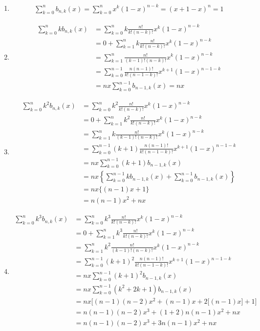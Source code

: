 \begin{enumerate}
	\item 
	\begin{align*}
		\sum_{k=0}^{n} b_{n,k}(x) = \sum_{k=0}^{n} x^k (1-x)^{n-k} = (x+1-x)^n = 1
	\end{align*}
	\item 
	\begin{align*}
		\sum_{k=0}^{n} k b_{n,k}(x) &= \sum_{k=0}^{n} k \frac{n!}{k!(n-k)!} x^k (1-x)^{n-k}\\
		&= 0 + \sum_{k=1}^{n} k \frac{n!}{k!(n-k)!} x^k (1-x)^{n-k}\\
		&= \sum_{k=1}^{n} \frac{n!}{(k-1)!(n-k)!} x^k (1-x)^{n-k}\\
		&= \sum_{k=0}^{n-1} \frac{n (n-1)!}{k! (n-1-k)!} x^{k+1} (1-x)^{n-1-k} \\
		&= nx \sum_{k=0}^{n-1} b_{n-1,k}(x) = nx
	\end{align*}
	\item 
	\begin{align*}
		\sum_{k=0}^{n} k^2 b_{n,k}(x) &= \sum_{k=0}^{n} k^2 \frac{n!}{k!(n-k)!} x^k(1-x)^{n-k}\\
		&= 0 + \sum_{k=1}^{n}  k^2 \frac{n!}{k!(n-k)!} x^k(1-x)^{n-k}\\
		&= \sum_{k=1}^{n} k \frac{n!}{(k-1)!(n-k)!} x^k (1-x)^{n-k}\\
		&= \sum_{k=0}^{n-1} (k+1) \frac{n(n-1)!}{k!(n-1-k)!} x^{k+1} (1-x)^{n-1-k}\\
		&= nx \sum_{k=0}^{n-1} (k+1) b_{n-1,k}(x)\\
		&= nx \left\{\sum_{k=0}^{n-1}kb_{n-1,k}(x) + \sum_{k=0}^{n-1} b_{n-1,k}(x)\right\}\\
		&= nx \Big\{(n-1)x+1\Big\}\\
	&= n(n-1)x^2 + nx
	\end{align*}
		\item 
	\begin{align*}
		\sum_{k=0}^{n} k^3 b_{n,k}(x) 	 &= \sum_{k=0}^{n}k^3 \frac{n!}{k!(n-k)!} x^k (1-x)^{n-k}\\
		&= 0 + \sum_{k=1}^{n}k^3 \frac{n!}{k!(n-k)!} x^k (1-x)^{n-k}\\
		&= \sum_{k=1}^{n}k^2 \frac{n!}{(k-1)!(n-k)!} x^k (1-x)^{n-k}\\
		&= \sum_{k=0}^{n-1}(k+1)^2 \frac{n(n-1)!}{k!(n-1-k)!} x^{k+1} (1-x)^{n-1-k}\\
		&= nx \sum_{k=0}^{n-1} (k+1)^2 b_{n-1,k}(x)\\
		&= nx \sum_{k=0}^{n-1} (k^2+2k+1) b_{n-1,k}(x)\\
		&= nx \Big[(n-1)(n-2)x^2 + (n-1)x + 2\big[(n-1)x\big] + 1\Big]\\
		&= n(n-1)(n-2)x^3 + (1+2)n(n-1)x^2 + nx\\
		&= n(n-1)(n-2)x^3 + 3n(n-1)x^2 + nx\\
	\end{align*}
\end{enumerate}

